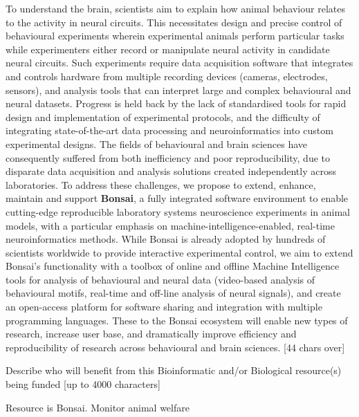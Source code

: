 To understand the brain, scientists aim to explain how animal behaviour relates to the activity in neural circuits. This necessitates design and precise control of behavioural experiments wherein experimental animals perform particular tasks while experimenters either record or manipulate neural activity in candidate neural circuits. Such experiments require data acquisition software that integrates and controls hardware from multiple recording devices (cameras, electrodes, sensors), and analysis tools that can interpret large and complex behavioural and neural datasets. Progress is held back by the lack of standardised tools for rapid design and implementation of experimental protocols, and the difficulty of integrating state-of-the-art data processing and neuroinformatics into custom experimental designs. The fields of behavioural and brain sciences have consequently suffered from both inefficiency and poor reproducibility, due to disparate data acquisition and analysis solutions created independently across laboratories.   
To address these challenges, we propose  to  extend,  enhance,  maintain  and  support \textbf{Bonsai},  a  fully  integrated  software  environment  to enable cutting-edge reproducible laboratory systems neuroscience experiments in animal models, with a particular emphasis on machine-intelligence-enabled, real-time neuroinformatics methods. While Bonsai is already adopted by hundreds of scientists worldwide to provide interactive experimental control, we aim to extend Bonsai’s functionality with a toolbox of online and offline Machine Intelligence tools for analysis of behavioural and neural data (video-based analysis of behavioural motifs, real-time and off-line analysis of neural signals), and create an open-access platform for software sharing and integration with multiple programming languages. These to the Bonsai ecosystem will enable new types of research, increase user base, and dramatically improve efficiency and reproducibility of research across behavioural and brain sciences.
[44 chars over]


Describe who will benefit from this Bioinformatic and/or Biological resource(s) being funded [up to 4000 characters]

Resource is Bonsai.
Monitor animal welfare


